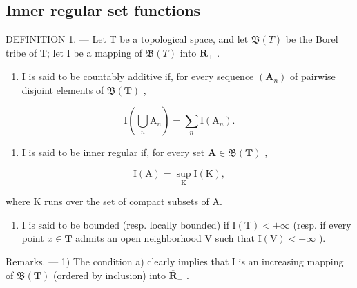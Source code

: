 \subsection{Inner regular set functions}

DEFINITION 1. --- Let T be a topological space, and let \(\mathfrak{B}(T)\) be the Borel tribe of T; let I be a mapping of \(\mathfrak{B}(T)\) into \(\overline{\mathbf{R}}_{+}\) .

\begin{enumerate}
\def\labelenumi{\alph{enumi})}
\tightlist
\item
  I is said to be countably additive if, for every sequence \((\mathbf{A}_{n})\) of pairwise disjoint elements of \(\mathfrak{B}(\mathbf{T})\) ,
\end{enumerate}

\[
\mathrm{I} \left(\bigcup_ {n} \mathrm{A} _ {n}\right) = \sum_ {n} \mathrm{I} (\mathrm{A} _ {n}).\tag{4}
\]

\begin{enumerate}
\def\labelenumi{\alph{enumi})}
\setcounter{enumi}{1}
\tightlist
\item
  I is said to be inner regular if, for every set \(\mathbf{A} \in \mathfrak{B}(\mathbf{T})\) ,
\end{enumerate}

\[
\mathrm{I} (\mathrm{A}) = \sup _ {\mathrm{K}} \mathrm{I} (\mathrm{K}),\tag{5}
\]

where K runs over the set of compact subsets of A.

\begin{enumerate}
\def\labelenumi{\alph{enumi})}
\setcounter{enumi}{2}
\tightlist
\item
  I is said to be bounded (resp. locally bounded) if \(\mathrm{I(T)} < +\infty\) (resp. if every point \(x \in \mathbf{T}\) admits an open neighborhood V such that \(\mathrm{I(V)} < +\infty\) ).
\end{enumerate}

Remarks. --- 1) The condition a) clearly implies that I is an increasing mapping of \(\mathfrak{B}(\mathbf{T})\) (ordered by inclusion) into \(\overline{\mathbf{R}}_{+}\) .

